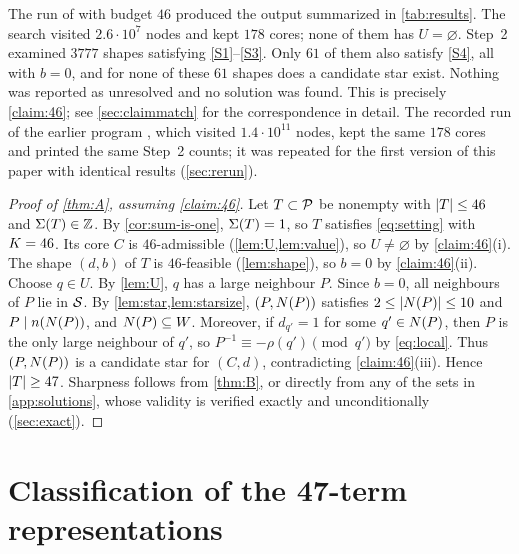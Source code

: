 \documentclass[11pt]{article}
\begin{document}
The run of  with budget $46$ produced the output summarized in \cref{tab:results}. The search visited $2.6\cdot10^{7}$ nodes and kept $178$ cores; none of them has $U=\varnothing$. Step~2 examined $3777$ shapes satisfying \ref{S1}--\ref{S3}. Only $61$ of them also satisfy \ref{S4}, all with $b=0$, and for none of these $61$ shapes does a candidate star exist. Nothing was reported as unresolved and no solution was found.
This is precisely \cref{claim:46}; see \cref{sec:claimmatch} for the correspondence in detail.
The recorded run of the earlier program , which visited $1.4\cdot10^{11}$ nodes, kept the same $178$ cores and printed the same Step~2 counts; it was repeated for the first version of this paper with identical results (\cref{sec:rerun}).

\begin{proof}[Proof of \cref{thm:A}, assuming \cref{claim:46}]
Let $T\subset\mathcal{P}$ be nonempty with $\lvert T\rvert\le46$ and $\Sigma(T)\in\mathbb{Z}$.
By \cref{cor:sum-is-one}, $\Sigma(T)=1$, so $T$ satisfies \eqref{eq:setting} with $K=46$.
Its core $C$ is $46$-admissible (\cref{lem:U,lem:value}), so $U\ne\varnothing$ by \cref{claim:46}(i).
The shape $(d,b)$ of $T$ is $46$-feasible (\cref{lem:shape}), so $b=0$ by \cref{claim:46}(ii).
Choose $q\in U$. By \cref{lem:U}, $q$ has a large neighbour $P$. Since $b=0$, all neighbours of $P$ lie in $\mathcal{S}$.
By \cref{lem:star,lem:starsize}, $(P,N(P))$ satisfies $2\le\lvert N(P)\rvert\le10$ and $P\mid n(N(P))$, and $N(P)\subseteq W$. Moreover, if $d_{q'}=1$ for some $q'\in N(P)$, then $P$ is the only large neighbour of $q'$, so $P^{-1}\equiv-\rho(q')\pmod{q'}$ by \eqref{eq:local}.
Thus $(P,N(P))$ is a candidate star for $(C,d)$, contradicting \cref{claim:46}(iii).
Hence $\lvert T\rvert\ge47$. Sharpness follows from \cref{thm:B}, or directly from any of the sets in \cref{app:solutions}, whose validity is verified exactly and unconditionally (\cref{sec:exact}).
\end{proof}

\section{Classification of the 47-term representations}\label{sec:proof47}
\end{document}
